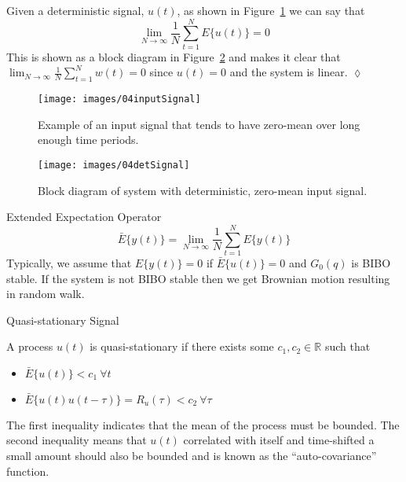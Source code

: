 \begin{example}
Given a deterministic signal, $u(t)$, as shown in Figure~\ref{fig:04inputSignal} we can say that
$$\lim_{N\to\infty}\frac{1}{N}\sum_{t=1}^N E\{u(t)\} = 0$$
This is shown as a block diagram in Figure~\ref{fig:04detSignal} and makes it clear that $\lim_{N\to\infty}\frac{1}{N}\sum_{t=1}^N w(t)=0$ since $u(t)=0$ and the system is linear.
$\lozenge$
\end{example}
\begin{figure}[ht!]
\centering
\texttt{[image: images/04inputSignal]}
\caption{Example of an input signal that tends to have zero-mean over long enough time periods.}
\label{fig:04inputSignal}
\end{figure}

\begin{figure}[ht!]
\centering
\texttt{[image: images/04detSignal]}
\caption{Block diagram of system with deterministic, zero-mean input signal.}
\label{fig:04detSignal}
\end{figure}

\begin{definition}{Extended Expectation Operator}
$$\bar{E}\{y(t)\}=\lim_{N\to\infty}\frac{1}{N}\sum_{t=1}^N E\{y(t)\}$$
Typically, we assume that $E\{y(t)\}=0$ if $\bar{E}\{u(t)\}=0$ and $G_0(q)$ is BIBO stable.
If the system is not BIBO stable then we get Brownian motion resulting in random walk.
\end{definition}

\begin{definition}{Quasi-stationary Signal}

\label{def:quasistationary}
A process $u(t)$ is quasi-stationary if there exists some $c_1, c_2 \in\mathbb{R}$ such that
\begin{itemize}
\item $\bar{E}\{u(t)\} < c_1~\forall t$
\item $\bar{E}\{u(t)u(t-\tau)\} = R_u(\tau) < c_2~\forall \tau$
\end{itemize}
The first inequality indicates that the mean of the process must be bounded.
The second inequality means that $u(t)$ correlated with itself and time-shifted a small amount should also be bounded and is known as the ``auto-covariance'' function.
\end{definition}

